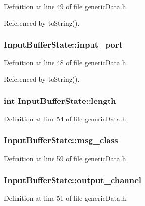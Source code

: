 Definition at line 49 of file genericData.h.

Referenced by toString().
\subsubsection[{input\_\-port}]{ {\bf InputBufferState::input\_\-port}}\label{classInputBufferState_264d5267a62d140c4edf91872a60a5f1}




Definition at line 48 of file genericData.h.

Referenced by toString().
\subsubsection[{length}]{\setlength{\rightskip}{0pt plus 5cm}int {\bf InputBufferState::length}}\label{classInputBufferState_28839fc48c086abc5ced537a06ed9cfe}




Definition at line 54 of file genericData.h.
\subsubsection[{msg\_\-class}]{ {\bf InputBufferState::msg\_\-class}}\label{classInputBufferState_237437ac476f4dade1871cca3c1be6b4}




Definition at line 59 of file genericData.h.
\subsubsection[{output\_\-channel}]{ {\bf InputBufferState::output\_\-channel}}\label{classInputBufferState_590d193e9f769be0119348a591e39f23}




Definition at line 51 of file genericData.h.

